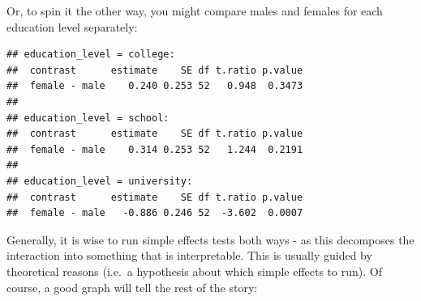 \documentclass[
]{book}
\begin{document}
Or, to spin it the other way, you might compare males and females for each education level separately:

\begin{verbatim}
## education_level = college:
##  contrast      estimate    SE df t.ratio p.value
##  female - male    0.240 0.253 52   0.948  0.3473
## 
## education_level = school:
##  contrast      estimate    SE df t.ratio p.value
##  female - male    0.314 0.253 52   1.244  0.2191
## 
## education_level = university:
##  contrast      estimate    SE df t.ratio p.value
##  female - male   -0.886 0.246 52  -3.602  0.0007
\end{verbatim}

Generally, it is wise to run simple effects tests both ways - as this decomposes the interaction into something that is interpretable. This is usually guided by theoretical reasons (i.e.~a hypothesis about which simple effects to run). Of course, a good graph will tell the rest of the story:
\end{document}
